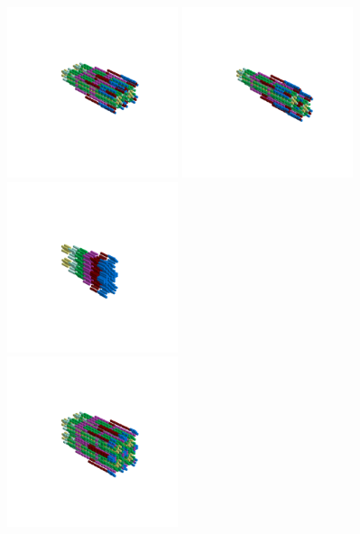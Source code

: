 \begin{minipage}[b]{0.48\linewidth}                                       
  \begin{figure}[H]
      \centering
        \vspace*{-1cm}
        \hspace*{-2cm}
        \includegraphics[width=5cm]{src/symmetries/pattern6_1-45.png}%
        \hspace*{-3cm}
        \includegraphics[width=5cm]{src/symmetries/pattern6_2-45.png}\\
        \vspace*{-3cm}
        \hspace*{-4cm}
        \includegraphics[width=5cm]{src/symmetries/pattern6_3-45.png} \\
        \vspace*{-5cm}
        \includegraphics[width=5cm]{src/symmetries/pattern6_4-45.png}
        \vspace*{-1cm}
  \caption*{}
  \end{figure}
\end{minipage}

